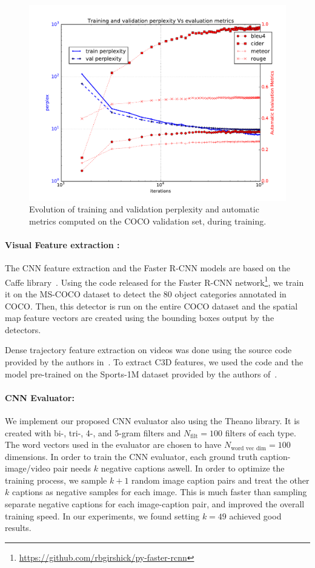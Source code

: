 \begin{figure}[ht]
\begin{center}
  \includegraphics[width=0.7\linewidth]{images/MetVsPerplex.pdf}
\end{center}
\vspace*{-10mm}
\caption{Evolution of training and validation perplexity and automatic metrics
        computed on the COCO validation set, during training.}
\label{fig:MetVsPerplex}
\end{figure}
\paragraph*{Visual Feature extraction : }%
The CNN feature extraction and the Faster R-CNN models are based on the Caffe
library~\cite{jia2014caffe}.
Using the code released for the Faster R-CNN
network\footnote{\url{https://github.com/rbgirshick/py-faster-rcnn}}, we train it on
the MS-COCO dataset to detect the 80 object categories annotated in COCO.
Then, this detector is run on the entire COCO dataset and the spatial map feature
vectors are created using the bounding boxes output by the detectors.

Dense trajectory feature extraction on videos was done using the source code
provided by the authors in~\cite{DBLP:conf/cvpr/WangKSL11}.
To extract C3D features, we used the code and the model pre-trained on the
Sports-1M dataset provided by the authors of~\cite{DBLP:C3D}.

\paragraph*{CNN Evaluator:} We implement our proposed CNN evaluator also using
the Theano library. 
It is created with bi-, tri-, 4-, and 5-gram filters and $N_{\text{filt}}=100$
filters of each type.
The word vectors used in the evaluator are chosen to have $N_{\text{word vec
dim}}=100$ dimensions.
In order to train the CNN evaluator, each ground truth caption-image/video pair
needs $k$ negative captions aswell.
In order to optimize the training process, we sample $k+1$ random image caption
pairs and treat the other $k$ captions as negative samples for each image.
This is much faster than sampling separate negative captions for each
image-caption pair, and improved the overall training speed.
In our experiments, we found setting $k=49$ achieved good results.

